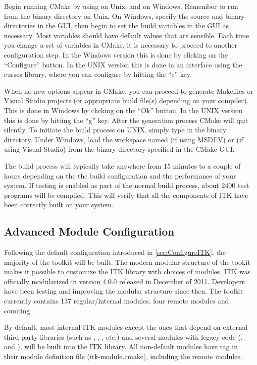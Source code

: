 Begin running CMake by using  on Unix, and  on
Windows.  Remember to run  from the binary directory on Unix. On
Windows, specify the source and binary directories in the GUI, then begin to
set the build variables in the GUI as necessary.  Most variables should have
default values that are sensible. Each time you change a set of variables in
CMake, it is necessary to proceed to another configuration step. In the
Windows version this is done by clicking on the ``Configure'' button. In the
UNIX version this is done in an interface using the curses library, where you
can configure by hitting the ``c'' key.

When no new options appear in CMake, you can proceed to generate Makefiles or
Visual Studio projects (or appropriate build file(s) depending on your
compiler). This is done in Windows by clicking on the ``Ok'' button.  In the
UNIX version this is done by hitting the ``g'' key. After the generation
process CMake will quit silently. To initiate the build process on UNIX,
simply type  in the binary directory. Under Windows, load the
workspace named  (if using MSDEV) or  (if using
Visual Studio) from the binary directory specified in the CMake GUI.

The build process will typically take anywhere from 15 minutes to a couple of
hours depending on the the build configuration and the performance of your
system. If testing is enabled as part of the normal build process,
about 2400 test programs will be compiled. This will verify that all the
components of ITK have been correctly built on your system.


\subsection{Advanced Module Configuration}
\label{sec:ModuleConfiguration}
Following the default configuration introduced in \ref{sec:ConfigureITK},
the majority of the toolkit will be built. The modern modular structure of the
tookit makes it possible to customize the ITK library with choices of modules.
ITK was officially modularized in version 4.0.0 released in December of 2011.
Developers have been testing and improving the modular structure since then.
The toolkit currently contains 137 regular/internal modules, four remote
modules and counting.

By default, most internal ITK modules except the ones that depend on external
third party libraries (such as , ,
, etc.) and several  modules with legacy code
(,  and ),  will
be built into the ITK library. All non-default modules have
 tag in their module definition file
(itk-module.cmake), including the remote modules.

